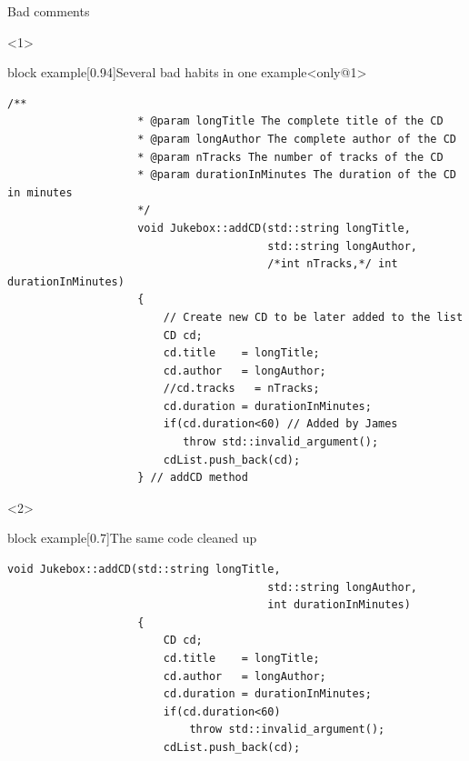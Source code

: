 \begin{frame}[fragile]{Bad comments}
    \begin{overlayarea}{\textwidth}{\textheight}
        \begin{onlyenv}<1>
            \vspace{-3mm}
            \begin{varblock}{block example}[0.94\textwidth]{Several bad habits in one example}<only@1>
                \begin{lstlisting}[style=MyCpp]
                    /**
                    * @param longTitle The complete title of the CD
                    * @param longAuthor The complete author of the CD
                    * @param nTracks The number of tracks of the CD
                    * @param durationInMinutes The duration of the CD in minutes
                    */
                    void Jukebox::addCD(std::string longTitle,
                                        std::string longAuthor,
                                        /*int nTracks,*/ int durationInMinutes)
                    {
                        // Create new CD to be later added to the list
                        CD cd;
                        cd.title    = longTitle;
                        cd.author   = longAuthor;
                        //cd.tracks   = nTracks;
                        cd.duration = durationInMinutes;
                        if(cd.duration<60) // Added by James
                           throw std::invalid_argument();
                        cdList.push_back(cd);
                    } // addCD method
                \end{lstlisting}
            \end{varblock}
        \end{onlyenv}
        \begin{onlyenv}<2>
            \begin{varblock}{block example}[0.7\textwidth]{The same code cleaned up}
                \begin{lstlisting}[style=MyCpp]
                    void Jukebox::addCD(std::string longTitle,
                                        std::string longAuthor,
                                        int durationInMinutes)
                    {
                        CD cd;
                        cd.title    = longTitle;
                        cd.author   = longAuthor;
                        cd.duration = durationInMinutes;
                        if(cd.duration<60)
                            throw std::invalid_argument();
                        cdList.push_back(cd);

\end{lstlisting}
\end{varblock}
\end{onlyenv}
\end{overlayarea}
\end{frame}
